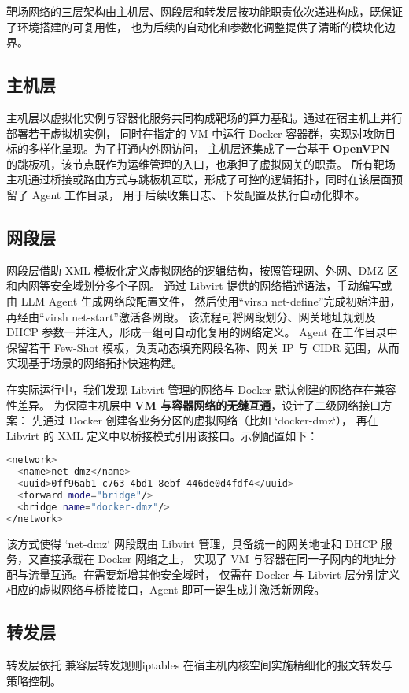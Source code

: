 \documentclass[lang=cn,10pt]{elegantbook}
\begin{document}
靶场网络的三层架构由主机层、网段层和转发层按功能职责依次递进构成，既保证了环境搭建的可复用性，
也为后续的自动化和参数化调整提供了清晰的模块化边界。


\subsection{主机层}
主机层以虚拟化实例与容器化服务共同构成靶场的算力基础。通过在宿主机上并行部署若干虚拟机实例，
同时在指定的 VM 中运行 Docker 容器群，实现对攻防目标的多样化呈现。为了打通内外网访问，
主机层还集成了一台基于 \textbf{OpenVPN }的跳板机，该节点既作为运维管理的入口，也承担了虚拟网关的职责。
所有靶场主机通过桥接或路由方式与跳板机互联，形成了可控的逻辑拓扑，同时在该层面预留了 Agent 工作目录，
用于后续收集日志、下发配置及执行自动化脚本。

\subsection{网段层}
网段层借助 XML 模板化定义虚拟网络的逻辑结构，按照管理网、外网、DMZ 区和内网等安全域划分多个子网。
通过 Libvirt 提供的网络描述语法，手动编写或由 LLM Agent 生成网络段配置文件，
然后使用“virsh net-define”完成初始注册，再经由“virsh net-start”激活各网段。
该流程可将网段划分、网关地址规划及 DHCP 参数一并注入，形成一组可自动化复用的网络定义。
Agent 在工作目录中保留若干 Few-Shot 模板，负责动态填充网段名称、网关 IP 与 CIDR 范围，从而实现基于场景的网络拓扑快速构建。

在实际运行中，我们发现 Libvirt 管理的网络与 Docker 默认创建的网络存在兼容性差异。
为保障主机层中 \textbf{VM 与容器网络的无缝互通}，设计了二级网络接口方案：
先通过 Docker 创建各业务分区的虚拟网络（比如 `docker-dmz`），
再在 Libvirt 的 XML 定义中以桥接模式引用该接口。示例配置如下：

\begin{lstlisting}[language=bash]
<network>
  <name>net-dmz</name>
  <uuid>0ff96ab1-c763-4bd1-8ebf-446de0d4fdf4</uuid>
  <forward mode="bridge"/>
  <bridge name="docker-dmz"/>
</network>
\end{lstlisting}

该方式使得 `net-dmz` 网段既由 Libvirt 管理，具备统一的网关地址和 DHCP 服务，又直接承载在 Docker 网络之上，
实现了 VM 与容器在同一子网内的地址分配与流量互通。在需要新增其他安全域时，
仅需在 Docker 与 Libvirt 层分别定义相应的虚拟网络与桥接接口，Agent 即可一键生成并激活新网段。

\subsection{转发层}
转发层依托 兼容层转发规则iptables 在宿主机内核空间实施精细化的报文转发与策略控制。
\end{document}
